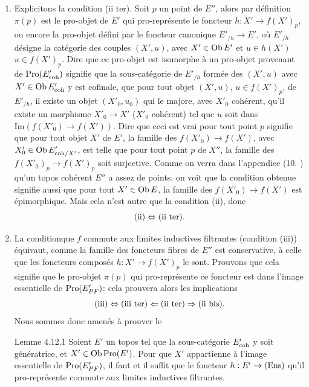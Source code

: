 \documentclass[10pt]{../fichiers-configuration-latex/smfart}
\begin{document}
\begin{enumerate}
\item Explicitons la condition (ii ter). Soit $p$ un point de $E''$,
  alors par définition $\pi(p)$ est le pro-objet de $E'$ qui
  pro-représente le foncteur $h : X'\to f(X')_{p}$, ou encore la
  pro-objet défini par le foncteur canonique $E'_{/h} \to E'$, où
  $E'_{/h}$  désigne la catégorie des couples $(X', u)$, avec $X'\in
  \operatorname{Ob} E'$ et $u \in h(X')$ \ie $u \in f(X')_p$. Dire que ce pro-objet
  est isomorphe à un pro-objet provenant de $\operatorname{Pro}(E'_{\mathrm{coh}})$ signifie
  que la sous-catégorie de $E'_{/h}$ formée des $(X', u)$ avec
  $X'\in \operatorname{Ob} E'_{\mathrm{coh}}$  y est cofinale, \ie que pour tout objet $(X',
  u)$, $u \in f(X')_p$, de $E'_{/h}$, il existe un objet $(X'_0,
  u_0)$ qui le majore, avec $X'_0$ cohérent, \ie qu'il existe un
  morphisme $X'_0 \to X'$ ($X'_0$ cohérent) tel que $u$ soit
  dans $\text{Im}(f(X'_0) \to f(X'))$. Dire que ceci est vrai pour tout
  point $p$ signifie que pour tout objet $X'$ de $E'$, la famille des
$f(X'_{0})\to f(X')$, avec $X'_0 \in \operatorname{Ob} E'_{\mathrm{coh}/X'}$, est telle que pour tout point $p$ de $X''$, la famille des $f(X'_0)_p \to f(X')_p$ soit surjective. Comme on verra dans
  l'appendice (10. ) qu'un topos cohérent $E''$ a assez de points, on
  voit que la condition obtenue signifie aussi que pour tout $X'\in \operatorname{Ob}
  E$, la famille des $f(X'_0) \to f(X')$ est épimorphique. Mais cela
  n'est autre que la condition (ii), donc
$$
{\rm(ii)} \Leftrightarrow \text{(ii ter)}{}.
$$

\item La condition\pageoriginale que $f$ commute aux limites
  inductives filtrantes   (condition (iii)) équivaut, comme la famille des foncteurs fibres
  de $E''$ est conservative, à celle que les foncteurs composés $h :
  X'\to f(X')_p$ le sont. Prouvons que cela signifie que le pro-objet
  $\pi(p)$ qui pro-représente ce foncteur est dans l'image essentielle
  de $\operatorname{Pro}(E'_{PF})$: cela prouvera alors les implications
$$
{\rm(iii)} \Leftrightarrow \text{(iii ter)} \Leftarrow \text{(ii ter)}
\Rightarrow \text{(ii bis)}{}.
$$
Nous sommes donc amenés à prouver le

\begin{enonce*}{Lemme 4.12.1}
Soient $E'$ un topos tel que la sous-catégorie $E'_{\mathrm{coh}}$ y soit
génératrice, et $X' \in \operatorname{Ob} \operatorname{Pro}(E')$. Pour que $X'$ appartienne à
l'image essentielle de $\operatorname{Pro}(E'_{PF})$, il faut et il suffit que le
foncteur $h : E'\to (\Ens)$ qu'il pro-représente commute aux limites
inductives filtrantes.
\end{enonce*}


\end{enumerate}
\end{document}
